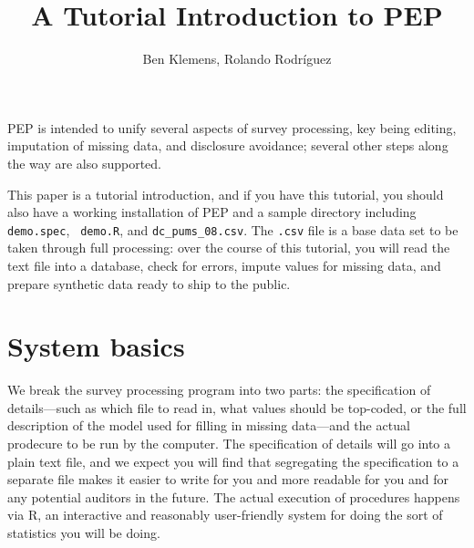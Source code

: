 \documentclass{article}
\begin{document}
\title{A Tutorial Introduction to PEP}
\author{Ben Klemens, Rolando Rodr\'iguez}
\long{}

\maketitle 

\newenvironment{specbit}{\latexhtml{}{\begin{rawhtml}
<div class="spec">
\end{rawhtml}}}
{\latexhtml{}{\begin{rawhtml}
</div>
\end{rawhtml}}}

\newenvironment{rcode}{\latexhtml{}{\begin{rawhtml}
<div class="rcode">
\end{rawhtml}}}
{\latexhtml{}{\begin{rawhtml}
</div>
\end{rawhtml}}}

PEP is intended to unify several aspects of survey processing, key being
editing, imputation of missing data, and disclosure avoidance; several other
steps along the way are also supported. 

This paper is a tutorial introduction, and if you have this tutorial, you should also have
a working installation of PEP and a sample directory including {\tt demo.spec}, {\tt
demo.R}, and {\tt dc\_pums\_08.csv}. The {\tt .csv} file is a base data set to be taken
through full processing: over the course of this tutorial, you will read the text
file into a database, check for errors, impute values for missing data, and prepare
synthetic data ready to ship to the public.


\section{System basics}
We break the survey processing program into two parts: the specification of details---such
as which file to read in, what values should be top-coded, or the full description of the
model used for filling in missing data---and the actual prodecure to be run by the
computer.  The specification of details will go into a plain text file, and we expect
you will find that segregating the specification to a separate file makes it easier to
write for you and more readable for you and for any potential auditors in the future.
The actual execution of procedures happens via R, an interactive and reasonably
user-friendly system for doing the sort of statistics you will be doing.
\end{document}
